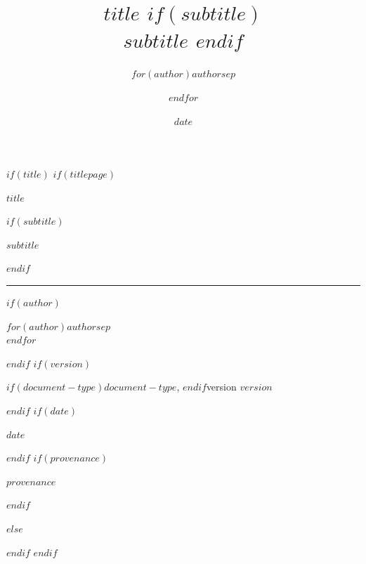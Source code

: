\documentclass[10pt]{article}
\title{
  \vspace{-2em}
  \color{AccentPrimary}\Huge\bfseries
  $title$
  $if(subtitle)$
  \\
  \vspace{0.5em}
  \Large\color{TextSecondary}
  $subtitle$
  $endif$
}
\author{
  \large\color{TextPrimary}
  $for(author)$$author$$sep$ \and $endfor$
}
\date{\color{TextSecondary}$date$}
\date{}
\begin{document}
%
%
$if(title)$
$if(titlepage)$
\begin{titlepage}
\thispagestyle{empty}
\raggedright
{\color{AccentPrimary}\fontsize{34}{40}\selectfont\bfseries $title$\par}
$if(subtitle)$
\vspace{1.2em}
{\color{TextSecondary}\LARGE $subtitle$\par}
$endif$
\vspace{1.8em}
{\color{AccentPrimary}\rule{0.28\textwidth}{1.2pt}\par}
\vspace{1.8em}
$if(author)$
{\color{TextPrimary}\large $for(author)$$author$$sep$\\$endfor$\par}
$endif$
$if(version)$
\vspace{0.5em}
{\color{TextSecondary}\large $if(document-type)$$document-type$, $endif$version $version$\par}
$endif$
$if(date)$
\vspace{0.35em}
{\color{TextSecondary}\large $date$\par}
$endif$
$if(provenance)$
{\color{TextSecondary}\footnotesize\ttfamily $provenance$\par}
$endif$
\end{titlepage}
\clearpage
$else$
\maketitle
\thispagestyle{fancy}
$endif$
$endif$
\end{document}
